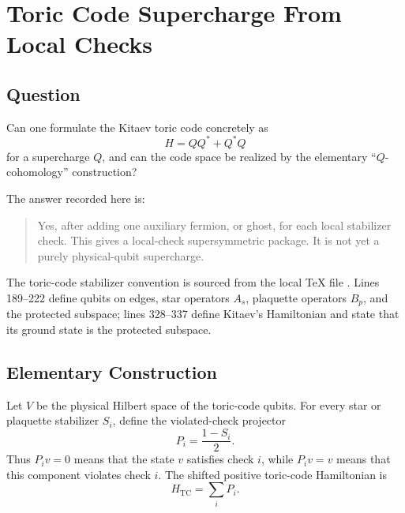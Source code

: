 
\section{Toric Code Supercharge From Local Checks}

\subsection{Question}

Can one formulate the Kitaev toric code concretely as
\[
  H = Q Q^* + Q^* Q
\]
for a supercharge \(Q\), and can the code space be realized by the elementary
``\(Q\)-cohomology'' construction?

The answer recorded here is:

\begin{quote}
Yes, after adding one auxiliary fermion, or ghost, for each local stabilizer
check. This gives a local-check supersymmetric package. It is not yet a
purely physical-qubit supercharge.
\end{quote}

The toric-code stabilizer convention is sourced from the local TeX file
. Lines
189--222 define qubits on edges, star operators \(A_s\), plaquette operators
\(B_p\), and the protected subspace; lines 328--337 define Kitaev's
Hamiltonian and state that its ground state is the protected subspace.

\subsection{Elementary Construction}

Let \(V\) be the physical Hilbert space of the toric-code qubits. For every
star or plaquette stabilizer \(S_i\), define the violated-check projector
\[
  P_i = \frac{1-S_i}{2}.
\]
Thus \(P_i v=0\) means that the state \(v\) satisfies check \(i\), while
\(P_i v=v\) means that this component violates check \(i\). The shifted
positive toric-code Hamiltonian is
\[
  H_{\mathrm{TC}} = \sum_i P_i .
\]

